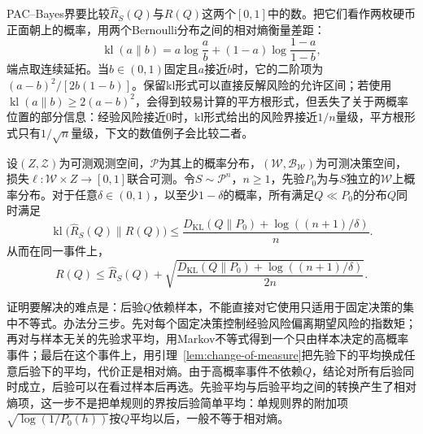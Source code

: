 PAC--Bayes界要比较$\hat R_S(Q)$与$R(Q)$这两个$[0,1]$中的数。把它们看作两枚硬币正面朝上的概率，用两个Bernoulli分布之间的相对熵衡量差距：
\[
 \operatorname{kl}(a\|b)=a\log\frac ab+(1-a)\log\frac{1-a}{1-b},
\]
端点取连续延拓。当$b\in(0,1)$固定且$a$接近$b$时，它的二阶项为$(a-b)^2/[2b(1-b)]$。保留kl形式可以直接反解风险的允许区间；若使用$\operatorname{kl}(a\|b)\geq2(a-b)^2$，会得到较易计算的平方根形式，但丢失了关于两概率位置的部分信息：经验风险接近0时，kl形式给出的风险界接近$1/n$量级，平方根形式只有$1/\sqrt n$量级，下文的数值例子会比较二者。

\begin{theorem}
\label{thm:pac-bayes-bound}
设$(Z,\mathcal Z)$为可测观测空间，$\mathcal P$为其上的概率分布，$(\mathcal W,\mathcal B_{\mathcal W})$为可测决策空间，损失$\ell:\mathcal W\times Z\to[0,1]$联合可测。令$S\sim\mathcal P^n$，$n\geq1$，先验$P_0$为与$S$独立的$\mathcal W$上概率分布。对于任意$\delta\in(0,1)$，以至少$1-\delta$的概率，所有满足$Q\ll P_0$的分布$Q$同时满足
\begin{equation}
 \operatorname{kl}\bigl(\hat R_S(Q)\|R(Q)\bigr)\leq\frac{D_{\mathrm{KL}}(Q\|P_0)+\log((n+1)/\delta)}{n}.
 \label{eq:pac-bayes-kl}
\end{equation}
从而在同一事件上，
\[
 R(Q)\leq\hat R_S(Q)+\sqrt{\frac{D_{\mathrm{KL}}(Q\|P_0)+\log((n+1)/\delta)}{2n}}.
\]
\end{theorem}

证明要解决的难点是：后验$Q$依赖样本，不能直接对它使用只适用于固定决策的集中不等式。办法分三步。先对每个固定决策控制经验风险偏离期望风险的指数矩；再对与样本无关的先验求平均，用Markov不等式得到一个只由样本决定的高概率事件；最后在这个事件上，用引理~\ref{lem:change-of-measure}把先验下的平均换成任意后验下的平均，代价正是相对熵。由于高概率事件不依赖$Q$，结论对所有后验同时成立，后验可以在看过样本后再选。先验平均与后验平均之间的转换产生了相对熵项，这一步不是把单规则的界按后验简单平均：单规则界的附加项$\sqrt{\log(1/P_0(h))}$按$Q$平均以后，一般不等于相对熵。

